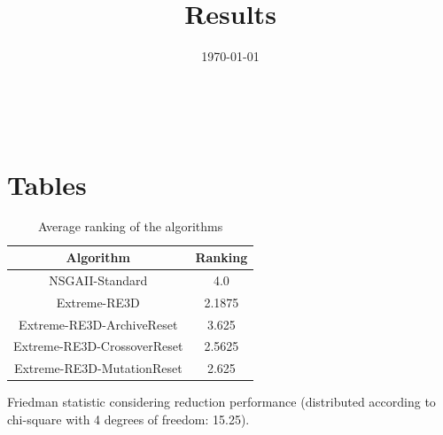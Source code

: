 \documentclass{article}
\title{Results}
\author{}
\date{\today}
\begin{document}
\oddsidemargin 0in \topmargin 0in\maketitle
\
\section{Tables}
\begin{table}[!htp]
\centering
\caption{Average ranking of the algorithms}
\begin{tabular}{c|c}
Algorithm&Ranking\\
\hline
NSGAII-Standard&4.0\\
Extreme-RE3D&2.1875\\
Extreme-RE3D-ArchiveReset&3.625\\
Extreme-RE3D-CrossoverReset&2.5625\\
Extreme-RE3D-MutationReset&2.625\\
\end{tabular}
\end{table}


Friedman statistic considering reduction performance (distributed according to chi-square with 4 degrees of freedom: 15.25).
\end{document}
